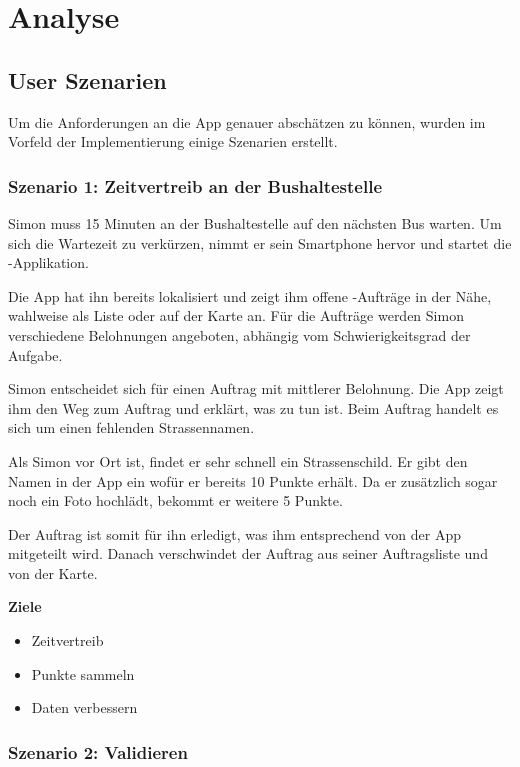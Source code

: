 \section{Analyse}

\subsection{User Szenarien}
\label{kort-user-szenarien}

Um die Anforderungen an die App genauer abschätzen zu können, wurden im Vorfeld der Implementierung einige Szenarien erstellt.

\subsubsection{Szenario 1: Zeitvertreib an der Bushaltestelle}

Simon muss 15 Minuten an der Bushaltestelle auf den nächsten Bus warten.
Um sich die Wartezeit zu verkürzen, nimmt er sein Smartphone hervor und startet die \kort{}-Applikation.

Die App hat ihn bereits lokalisiert und zeigt ihm offene -Aufträge in der Nähe, wahlweise als Liste oder auf der Karte an.
Für die Aufträge werden Simon verschiedene Belohnungen angeboten, abhängig vom Schwierigkeitsgrad der Aufgabe.

Simon entscheidet sich für einen Auftrag mit mittlerer Belohnung.
Die App zeigt ihm den Weg zum Auftrag und erklärt, was zu tun ist.
Beim Auftrag handelt es sich um einen fehlenden Strassennamen.

Als Simon vor Ort ist, findet er sehr schnell ein Strassenschild.
Er gibt den Namen in der App ein wofür er bereits 10 Punkte erhält.
Da er zusätzlich sogar noch ein Foto hochlädt, bekommt er weitere 5 Punkte.

Der Auftrag ist somit für ihn erledigt, was ihm entsprechend von der App mitgeteilt wird.
Danach verschwindet der Auftrag aus seiner Auftragsliste und von der Karte.

\textbf{Ziele}
\begin{itemize}
\item Zeitvertreib
\item Punkte sammeln
\item Daten verbessern
\end{itemize}

\subsubsection{Szenario 2: Validieren}

